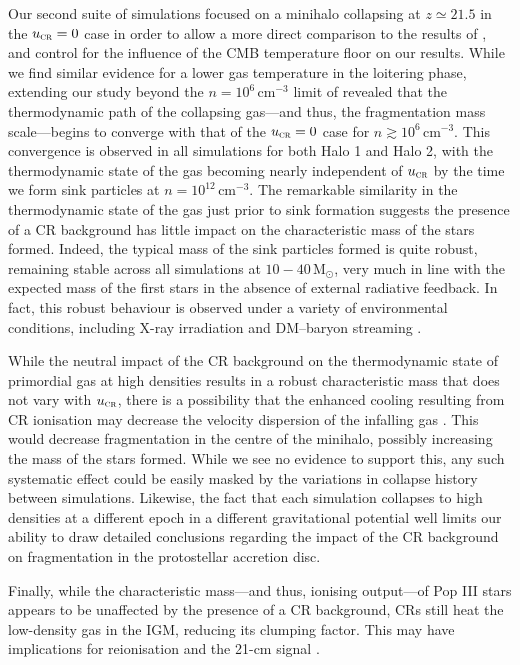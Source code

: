 \documentclass{thesis}
\newcommand{\cc}{\ensuremath{\,\mathrm{cm}^{-3}}\xspace}
\newcommand{\msun}{\ensuremath{\,\mathrm{M}_{\odot}}\xspace}
\newcommand{\ucr}{\ensuremath{{u}_{\textsc{cr}}}\xspace}
\begin{document}
Our second suite of simulations focused on a minihalo collapsing at $z\simeq21.5$ in the $\ucr=0$ case in order to allow a more direct comparison to the results of \citet{StacyBromm2007}, and control for the influence of the CMB temperature floor on our results.
While we find similar evidence for a lower gas temperature in the loitering phase, extending our study beyond the $n=10^6\cc$ limit of \citet{StacyBromm2007} revealed that the thermodynamic path of the collapsing gas---and thus, the fragmentation mass scale---begins to converge with that of the $\ucr=0$ case for $n\gtrsim10^6\cc$.  
This convergence is observed in all simulations for both Halo 1 and Halo 2, with the thermodynamic state of the gas becoming nearly independent of $\ucr$ by the time we form sink particles at $n=10^{12}\cc$.
The remarkable similarity in the thermodynamic state of the gas just prior to sink formation suggests the presence of a CR background has little impact on the characteristic mass of the stars formed.  
Indeed, the typical mass of the sink particles formed is quite robust, remaining stable across all simulations at $10-40\msun$, very much in line with the expected mass of the first stars in the absence of external radiative feedback. In fact, this robust behaviour is observed under a variety of environmental conditions, including X-ray irradiation \citep{Hummeletal2015} and DM--baryon streaming \citep{StacyBrommLoeb2011a,Greifetal2011b}.

While the neutral impact of the CR background on the thermodynamic state of primordial gas at high densities results in a robust characteristic mass that does not vary with $\ucr$, there is a possibility that the enhanced cooling resulting from CR ionisation may decrease the velocity dispersion of the infalling gas \citep{Clarketal2011a}.  
This would decrease fragmentation in the centre of the minihalo, possibly increasing the mass of the stars formed.
While we see no evidence to support this, any such systematic effect could be easily masked by the variations in collapse history between simulations.  
Likewise, the fact that each simulation collapses to high densities at a different epoch in a different gravitational potential well limits our ability to draw detailed conclusions regarding the impact of the CR background on fragmentation in the protostellar accretion disc.

Finally, while the characteristic mass---and thus, ionising output---of Pop III stars appears to be unaffected by the presence of a CR background, CRs still heat the low-density gas in the IGM, reducing its clumping factor. This may have implications for reionisation and the 21-cm signal \citep{FurlanettoPengBriggs2006, SazonovSunyaev2015}.
\end{document}
